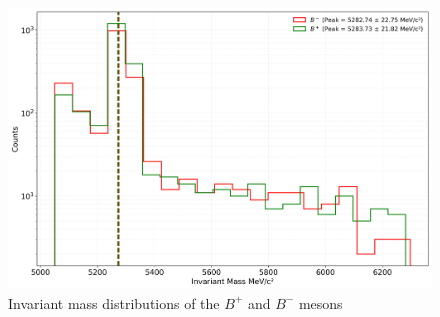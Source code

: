 
    \begin{figure}[H]
        \centering
        \includegraphics[scale=0.1]{Figure/hist_mass.png}
        \caption{Invariant mass distributions of the \(B^+\) and \(B^-\) mesons}
        \label{two_mass}
    \end{figure}

    
